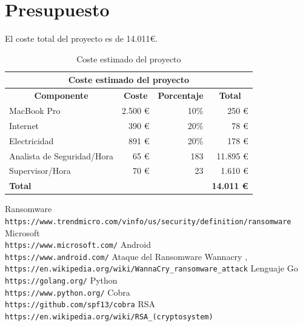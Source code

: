 \documentclass[a4paper,12pt]{article}
\begin{document}
\section{Presupuesto}
El coste total del proyecto es de 14.011\euro.
\begin{table}[H]
	\centering
	\begin{tabular}{@{}lrrr@{}}
		\toprule
		\multicolumn{4}{c}{{Coste estimado del proyecto}} \\ \midrule
		\multicolumn{1}{c}{\textbf{Componente}} & \multicolumn{1}{c}{\textbf{Coste}} & \multicolumn{1}{c}{\textbf{Porcentaje}} & \multicolumn{1}{c}{\textbf{Total}} \\
		MacBook Pro & 2.500 \euro & 10\% & 250 \euro \\
		Internet & 390 \euro & 20\% & 78 \euro \\
		Electricidad & 891 \euro & 20\% & 178 \euro \\
		Analista de Seguridad/Hora & 65 \euro & 183 & 11.895 \euro \\
		Supervisor/Hora & 70 \euro & 23 & 1.610 \euro \\
		\multicolumn{3}{l}{\textbf{Total}} & \textbf{14.011 \euro} \\ \bottomrule
	\end{tabular}
	\caption{Coste estimado del proyecto}
	\label{tab:table2}
\end{table}
\begin{thebibliography}{9}
Ransomware
\\\texttt{https://www.trendmicro.com/vinfo/us/security/definition/ransomware}
Microsoft
\\\texttt{https://www.microsoft.com/}
Android
\\\texttt{https://www.android.com/}
Ataque del Ransomware Wannacry ,
\\\texttt{https://en.wikipedia.org/wiki/WannaCry\_ransomware\_attack}
Lenguaje Go
\\\texttt{https://golang.org/}
Python
\\\texttt{https://www.python.org/}
Cobra
\\\texttt{https://github.com/spf13/cobra}
RSA
\\\texttt{https://en.wikipedia.org/wiki/RSA\_(cryptosystem)}
\end{thebibliography}
\end{document}
